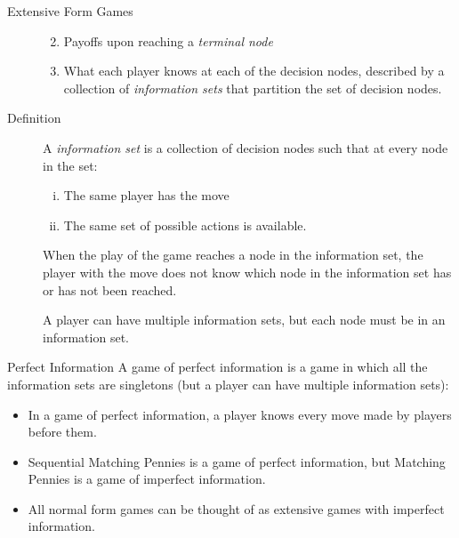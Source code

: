 \documentclass[8pt]{extarticle}
\begin{document}
\begin{problem}{Extensive Form Games}
\begin{description}
\begin{enumerate}[(1)]
\begin{enumerate}[(i)]
            \end{enumerate}
          \item Payoffs upon reaching a \textit{terminal node}
          \item What each player knows at each of the decision nodes, described by a collection of \textit{information sets} that partition the set of decision nodes.
        \end{enumerate}
      \item[Definition] A \textit{information set} is a collection of decision nodes such that at every node in the set:
        \begin{enumerate}[(i)]
          \item The same player has the move
          \item The same set of possible actions is available.
        \end{enumerate}
        When the play of the game reaches a node in the information set, the player with the move does not know which node in the information set has or has not been reached.\newline

        A player can have multiple information sets, but each node must be in an information set.
    \end{description}
  \end{problem}
  \begin{problem}{Perfect Information}
    A game of perfect information is a game in which all the information sets are singletons (but a player can have multiple information sets):
    \begin{itemize}
      \item In a game of perfect information, a player knows every move made by players before them.
      \item Sequential Matching Pennies is a game of perfect information, but Matching Pennies is a game of imperfect information.
      \item All normal form games can be thought of as extensive games with imperfect information.
    \end{itemize}
  \end{problem}
\end{document}
